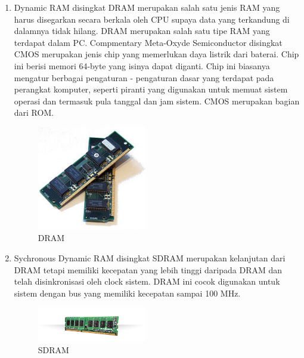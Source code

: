 \begin{enumerate}
\item Dynamic RAM disingkat DRAM merupakan salah satu jenis RAM yang harus disegarkan secara berkala oleh CPU supaya data yang terkandung di dalamnya tidak hilang. DRAM merupakan salah satu tipe RAM yang terdapat dalam PC.
Compmentary Meta-Oxyde Semiconductor disingkat CMOS merupakan jenis chip yang memerlukan daya listrik dari baterai. Chip ini berisi memori 64-byte yang isinya dapat diganti. Chip ini biasanya mengatur berbagai pengaturan - pengaturan dasar yang terdapat 
pada perangkat komputer, seperti piranti yang digunakan untuk memuat sistem operasi dan termasuk pula tanggal dan jam sistem. CMOS merupakan bagian dari ROM.
\begin{figure}[htbp]
\centering
\includegraphics[width=0.45\textwidth]{figures/image/DRAM.jpg}
\caption{DRAM}
\label{labelgambar1}
\end{figure}

\item Sychronous Dynamic RAM disingkat SDRAM merupakan kelanjutan dari DRAM tetapi memiliki kecepatan yang lebih tinggi daripada DRAM dan telah disinkronisasi oleh clock sistem. DRAM ini cocok digunakan untuk sistem dengan bus yang memiliki kecepatan sampai 100 MHz.
\begin{figure}[htbp]
\centering
\includegraphics[width=0.45\textwidth]{figures/image/sdram.jpg}
\caption{SDRAM}
\label{labelgambar2}
\end{figure}


\end{enumerate}
